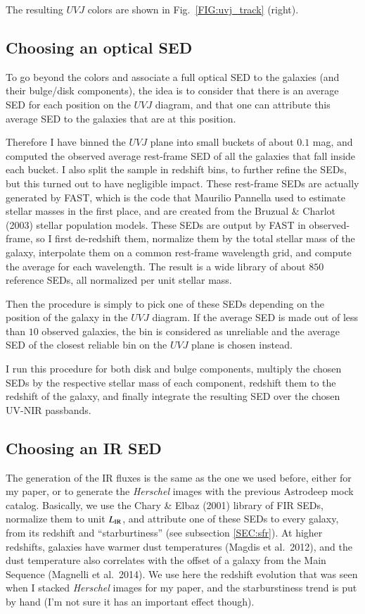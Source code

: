 \documentclass[12pt,a4paper]{article}
\newcommand{\rfig}[1]{Fig.~\ref{#1}}
\newcommand{\rsec}[1]{subsection \ref{#1}}
\newcommand{\herschel}{{\it Herschel}\xspace}
\newcommand{\lir}{L_{\rm IR}}
\newcommand{\uvj}{$UVJ$\xspace}
\begin{document}
The resulting \uvj colors are shown in \rfig{FIG:uvj_track} (right).


\subsection{Choosing an optical SED}

To go beyond the colors and associate a full optical SED to the galaxies (and their bulge/disk components), the idea is to consider that there is an average SED for each position on the \uvj diagram, and that one can attribute this average SED to the galaxies that are at this position.

Therefore I have binned the \uvj plane into small buckets of about $0.1$ mag, and computed the observed average rest-frame SED of all the galaxies that fall inside each bucket. I also split the sample in redshift bins, to further refine the SEDs, but this turned out to have negligible impact. These rest-frame SEDs are actually generated by FAST, which is the code that Maurilio Pannella used to estimate stellar masses in the first place, and are created from the Bruzual \& Charlot (2003) stellar population models. These SEDs are output by FAST in observed-frame, so I first de-redshift them, normalize them by the total stellar mass of the galaxy, interpolate them on a common rest-frame wavelength grid, and compute the average for each wavelength. The result is a wide library of about $850$ reference SEDs, all normalized per unit stellar mass.

Then the procedure is simply to pick one of these SEDs depending on the position of the galaxy in the \uvj diagram. If the average SED is made out of less than $10$ observed galaxies, the bin is considered as unreliable and the average SED of the closest reliable bin on the \uvj plane is chosen instead.

I run this procedure for both disk and bulge components, multiply the chosen SEDs by the respective stellar mass of each component, redshift them to the redshift of the galaxy, and finally integrate the resulting SED over the chosen UV-NIR passbands.


\subsection{Choosing an IR SED}

The generation of the IR fluxes is the same as the one we used before, either for my paper, or to generate the \herschel images with the previous Astrodeep mock catalog. Basically, we use the Chary \& Elbaz (2001) library of FIR SEDs, normalize them to unit $\lir$, and attribute one of these SEDs to every galaxy, from its redshift and ``starburtiness'' (see \rsec{SEC:sfr}). At higher redshifts, galaxies have warmer dust temperatures (Magdis et al.~2012), and the dust temperature also correlates with the offset of a galaxy from the Main Sequence (Magnelli et al.~2014). We use here the redshift evolution that was seen when I stacked \herschel images for my paper, and the starburstiness trend is put by hand (I'm not sure it has an important effect though).
\end{document}
